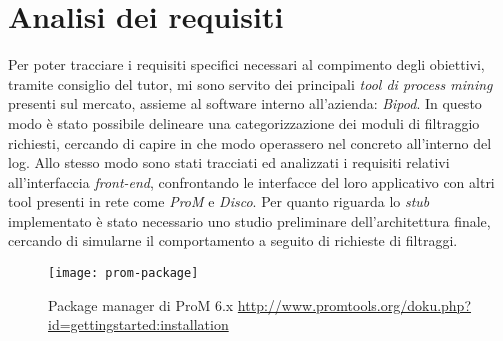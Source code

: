 \section{Analisi dei requisiti}
Per poter tracciare i requisiti specifici necessari al compimento degli obiettivi, tramite consiglio del tutor, mi sono servito dei principali \textit{tool di process mining} presenti sul mercato, assieme al software interno all'azienda: \textit{Bipod}. In questo modo è stato possibile delineare una categorizzazione dei moduli di filtraggio richiesti, cercando di capire in che modo operassero nel concreto all'interno del log. Allo stesso modo sono stati tracciati ed analizzati i requisiti relativi all'interfaccia \textit{front-end}, confrontando le interfacce del loro applicativo con altri tool presenti in rete come \textit{ProM} e \textit{\gls{Disco}}. Per quanto riguarda lo \textit{stub} implementato è stato necessario uno studio preliminare dell'architettura finale, cercando di simularne il comportamento a seguito di richieste di filtraggi. 
\begin{figure}[!h] 
	\centering 
	\texttt{[image: prom-package]} 
	\caption{Package manager di ProM 6.x \url{http://www.promtools.org/doku.php?id=gettingstarted:installation}}
\end{figure}


